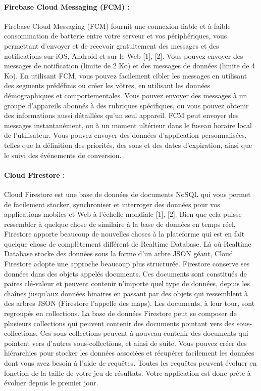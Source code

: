 \paragraph{Firebase Cloud Messaging (FCM) :\newline}
Firebase Cloud Messaging (FCM) fournit une connexion fiable et à faible consommation de
batterie entre votre serveur et vos périphériques, vous permettant d'envoyer et de recevoir
gratuitement des messages et des notifications sur iOS, Android et sur le Web [1], [2]. Vous
pouvez envoyer des messages de notification (limite de 2 Ko) et des messages de données
(limite de 4 Ko).
En utilisant FCM, vous pouvez facilement cibler les messages en utilisant des segments
prédéfinis ou créer les vôtres, en utilisant les données démographiques et comportementales.
Vous pouvez envoyer des messages à un groupe d'appareils abonnés à des rubriques
spécifiques, ou vous pouvez obtenir des informations aussi détaillées qu'un seul appareil.
FCM peut envoyer des messages instantanément, ou à un moment ultérieur dans le fuseau
horaire local de l'utilisateur. Vous pouvez envoyer des données d'application personnalisées,
telles que la définition des priorités, des sons et des dates d'expiration, ainsi que le suivi des
événements de conversion.
\paragraph{Cloud Firestore :\newline}
Cloud Firestore est une base de données de documents NoSQL qui vous permet de facilement
stocker, synchroniser et interroger des données pour vos applications mobiles et Web à l'échelle
mondiale [1], [2]. Bien que cela puisse ressembler à quelque chose de similaire à la base de
données en temps réel, Firestore apporte beaucoup de nouvelles choses à la plateforme qui est
en fait quelque chose de complètement différent de Realtime Database.
Là où Realtime Database stocke des données sous la forme d'un arbre JSON géant, Cloud
Firestore adopte une approche beaucoup plus structurée. Firestore conserve ses données dans des objets appelés documents. Ces documents sont constitués de paires clé-valeur et peuvent
contenir n'importe quel type de données, depuis les chaînes jusqu'aux données binaires en
passant par des objets qui ressemblent à des arbres JSON (Firestore l'appelle des maps). Les
documents, à leur tour, sont regroupés en collections.
La base de données Firestore peut se composer de plusieurs collections qui peuvent contenir
des documents pointant vers des sous-collections. Ces sous-collections peuvent à nouveau
contenir des documents qui pointent vers d'autres sous-collections, et ainsi de suite.
Vous pouvez créer des hiérarchies pour stocker les données associées et récupérer facilement
les données dont vous avez besoin à l'aide de requêtes. Toutes les requêtes peuvent évoluer en
fonction de la taille de votre jeu de résultats. Votre application est donc prête à évoluer depuis
le premier jour.

